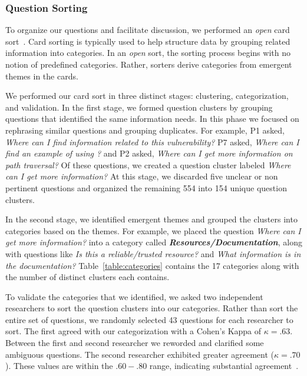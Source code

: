 \documentclass[10pt,journal,compsoc]{IEEEtran}
\begin{document}
\subsubsection{Question Sorting}
To organize our questions and facilitate discussion, we performed an \textit{open} card sort~\cite{hudson2013sorting}. 
Card sorting is typically used to help structure data by grouping related information into categories. 
In an \textit{open} sort, the sorting process begins with no notion of predefined categories. 
Rather, sorters derive categories from emergent themes in the cards. 

We performed our card sort in three distinct stages: clustering, categorization, and validation.
In the first stage, we formed question clusters by grouping questions that identified the same information needs. 
In this phase we focused on rephrasing similar questions and grouping duplicates.
For example, P1 asked, \textit{Where can I find information related to this vulnerability?} P7 asked, \textit{Where can I find an example of using ?} and P2 asked, \textit{Where can I get more information on path traversal?} 
Of these questions, we created a question cluster labeled \textit{Where can I get more information?}
At this stage, we discarded five unclear or non pertinent questions and organized the remaining 554 into 154 unique question clusters.

In the second stage, we identified emergent themes and grouped the clusters into categories based on the themes. 
For example, we placed the question \textit{Where can I get more information?} into a category called \emph{\textbf{Resources/Documentation}}, along with questions like \textit{Is this a reliable/trusted resource?} and \textit{What information is in the documentation?} 
Table~\ref{table:categories} contains the 17 categories along with the number of distinct clusters each contains. 

To validate the categories that we identified, we asked two independent researchers to sort the question clusters into our categories. 
Rather than sort the entire set of questions, we randomly selected 43 questions for each researcher to sort.
The first agreed with our categorization with a Cohen's Kappa of $\kappa = .63$. 
Between the first and second researcher we reworded and clarified some ambiguous questions. The second researcher exhibited greater agreement ($\kappa = .70$). 
These values are within the $.60 - .80$ range, indicating substantial agreement~\cite{Landis1977agreement}.
\end{document}
